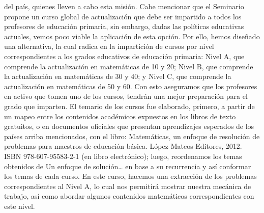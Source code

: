 del país, quienes lleven a cabo esta misión. Cabe mencionar que el Seminario propone un curso global de actualización que debe ser impartido a todos los profesores de educación primaria, sin embargo, dadas las políticas educativas actuales, vemos poco viable la aplicación de esta opción. Por ello, hemos diseñado una alternativa, la cual radica en la impartición de cursos por nivel correspondientes a los grados educativos de educación primaria: Nivel A, que comprende la actualización en matemáticas de 10 y 20; Nivel B, que comprende la actualización en matemáticas de 30 y 40; y Nivel C, que comprende la actualización en matemáticas de 50 y 60. Con esto aseguramos que los profesores en activo que tomen uno de los cursos, tendrán una mejor preparación para el grado que imparten. El temario de los cursos fue elaborado, primero, a partir de un mapeo entre los contenidos académicos expuestos en los libros de texto gratuitos, o en documentos oficiales que presentan aprendizajes esperados de los países arriba mencionados, con el libro: Matemáticas, un enfoque de resolución de problemas para maestros de educación básica. López Mateos Editores, 2012. ISBN 978-607-95583-2-1 (en libro electrónico); luego, reordenamos los temas obtenidos de Un enfoque de solución… en base a su recurrencia y así conformar los temas de cada curso. En este curso, hacemos una extracción de los problemas correspondientes al Nivel A, lo cual nos permitirá mostrar nuestra mecánica de trabajo, así como abordar algunos contenidos matemáticos correspondientes con este nivel.
